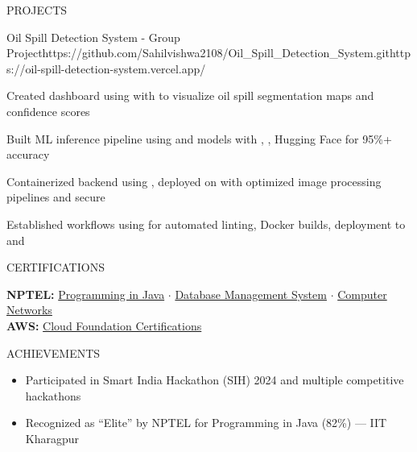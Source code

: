 \documentclass{resume}
\begin{document}
\begin{rSection}{PROJECTS}
\begin{rProject}{Oil Spill Detection System - Group Project}{https://github.com/Sahilvishwa2108/Oil_Spill_Detection_System.git}{https://oil-spill-detection-system.vercel.app/}
\item Created dashboard using  with  to visualize oil spill segmentation maps and confidence scores
\item Built ML inference pipeline using  and  models with , , Hugging Face for 95\%+ accuracy
\item Containerized backend using , deployed on  with optimized image processing pipelines and secure 
\item Established  workflows using  for automated linting, Docker builds, deployment to  and 
\end{rProject}

\end{rSection}

\begin{rSection}{CERTIFICATIONS}

\textbf{NPTEL:} \href{https://archive.nptel.ac.in/content/noc/NOC25/SEM1/Ecertificates/106/noc25-cs57/Course/NPTEL25CS57S124280252304432710.pdf}{Programming in Java} $\cdot$ \href{https://archive.nptel.ac.in/content/noc/NOC25/SEM1/Ecertificates/106/noc25-cs18/Course/NPTEL25CS18S53880028401363129.pdf}{Database Management System} $\cdot$ \href{https://archive.nptel.ac.in/content/noc/NOC25/SEM1/Ecertificates/106/noc25-cs57/Course/NPTEL25CS57S124280252304432710.pdf}{Computer Networks} \\[1pt]
\textbf{AWS:} \href{https://archive.nptel.ac.in/content/noc/NOC25/SEM1/Ecertificates/106/noc25-cs18/Course/NPTEL25CS18S53880028401363129.pdf}{Cloud Foundation Certifications}

\end{rSection}

\begin{rSection}{ACHIEVEMENTS}

\begin{itemize}[leftmargin=12pt, itemsep=0pt, label={\small$\bullet$}]
\item Participated in Smart India Hackathon (SIH) 2024 and multiple competitive hackathons
\item Recognized as ``Elite'' by NPTEL for Programming in Java (82\%) — IIT Kharagpur
\end{itemize}

\end{rSection}
\end{document}

